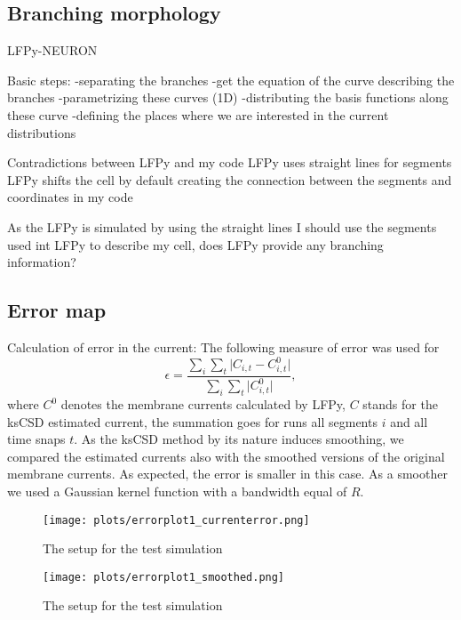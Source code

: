 \documentclass[12pt,a4paper]{article}
\begin{document}
\subsection{Branching morphology}

LFPy-NEURON

Basic steps:
-separating the branches
-get the equation of the curve describing the branches
-parametrizing these curves (1D)
-distributing the basis functions along these curve
-defining the places where we are interested in the current distributions
 
Contradictions between LFPy and my code
LFPy uses straight lines for segments
LFPy shifts the cell by default 
creating the connection between the segments and coordinates in my code

As the LFPy is simulated by using the straight lines I should use the segments used int LFPy to describe my cell, does LFPy provide any branching information?


\subsection{Error map}

Calculation of error in the current:
The following measure of error was used for  
\begin{equation}
\label{eq:berror_current}
\epsilon = \frac{ \sum \limits_i \sum \limits_t \vert C_{i,t}-C^0_{i,t} \vert }{\sum\limits_i \sum\limits_t \vert C^0_{i,t}\vert },
\end{equation}
where $C^0$ denotes the membrane currents calculated by LFPy, $C$ stands for the ksCSD estimated current, the summation goes for runs all segments $i$ and all time snaps $t$.  
As the ksCSD method by its nature induces smoothing, we compared the estimated currents also with the smoothed versions of the original membrane currents. As expected, the error is smaller in this case. As a smoother we used a Gaussian kernel function with a bandwidth equal of $R$.

\begin{figure}
\centering
\texttt{[image: plots/errorplot1\_currenterror.png]}
\caption{The setup for the test simulation}
\label{fig: error_current_map}
\end{figure}


\begin{figure}
\centering
\texttt{[image: plots/errorplot1\_smoothed.png]}
\caption{The setup for the test simulation}
\label{fig: error_current_smoothed_map}
\end{figure}
\end{document}
